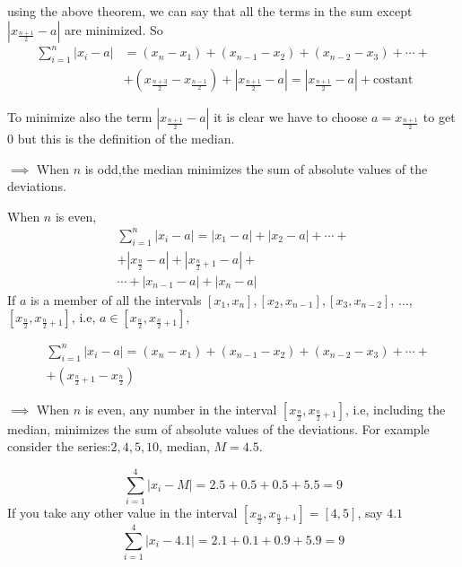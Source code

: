 \documentclass[12pt, letterpaper]{article}
\theoremstyle{definition}
\begin{document}
using the above theorem, we can say that all the terms in the sum except $\left|x_{\tfrac{n+1}{2}}-a\right|$ are minimized. So
\begin{equation}
\begin{aligned}
\sum_{i=1}^n|x_i-a|&=(x_n-x_1)+(x_{n-1}-x_2)+(x_{n-2}-x_3)+\cdots +\\
& +\left(x_{\tfrac{n+3}{2}}-x_{\tfrac{n-1}{2}}\right) + \left|x_{\tfrac{n+1}{2}}-a\right| = \left|x_{\tfrac{n+1}{2}}-a \right|+\text{costant}
\end{aligned}
\end{equation}

To minimize also the term $\left|x_{\tfrac{n+1}{2}}-a \right|$ it is clear we have to choose $a=x_{\tfrac{n+1}{2}}$ to get $0$ but this is the definition of the median.

$\implies$ When $n$ is odd,the median minimizes the sum of absolute values of the deviations.

When $n$ is even,
\begin{equation}
\begin{aligned}
\sum_{i=1}^n|x_i-a|=|x_1-a|+|x_2-a|+\cdots+\\
+|x_{\tfrac{n}{2}}-a|+|x_{\tfrac{n}{2}+1}-a|+\\
 \cdots+|x_{n-1}-a|+|x_n-a|
\end{aligned}
\end{equation}
If $a$ is a member of all the intervals $[x_1,x_n], [x_2,x_{n-1}], [x_3,x_{n-2}]$, $\ldots$, $\left[x_{\tfrac{n}{2}},x_{\tfrac{n}{2}+1}\right]$, i.e, $a\in\left[x_{\tfrac{n}{2}},x_{\tfrac{n}{2}+1}\right]$,

\begin{equation}
\begin{aligned}
&\sum_{i=1}^n|x_i-a|=(x_n-x_1)+(x_{n-1}-x_2)+(x_{n-2}-x_3)+\cdots + \\
&+\left(x_{\tfrac{n}{2}+1}-x_{\tfrac{n}{2}}\right)
\end{aligned}
\end{equation}

$\implies$ When $n$ is even, any number in the interval $[x_{\tfrac{n}{2}},x_{\tfrac{n}{2}+1}]$, i.e, including the median, minimizes the sum of absolute values of the deviations. For example consider the series:$2, 4, 5, 10$, median, $M=4.5$.

$$
\sum_{i=1}^4|x_i-M|=2.5+0.5+0.5+5.5=9
$$
If you take any other value in the interval $\left[x_{\tfrac{n}{2}},x_{\tfrac{n}{2} + 1} \right] =[4,5]$, say $4.1$
$$
\sum_{i=1}^4|x_i-4.1|=2.1+0.1+0.9+5.9=9
$$
\end{document}
